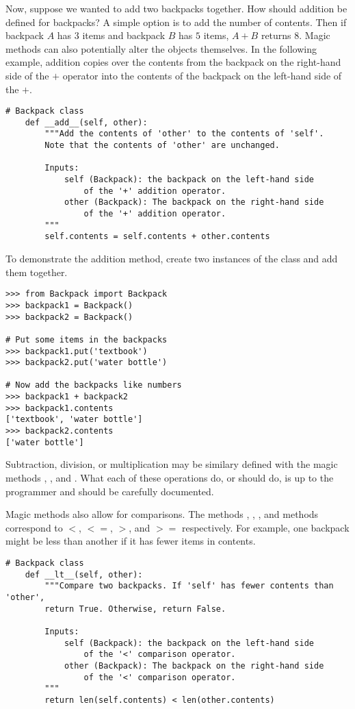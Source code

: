 Now, suppose we wanted to add two backpacks together.
How should addition be defined for backpacks?
A simple option is to add the number of contents.
Then if backpack $A$ has $3$ items and backpack $B$ has $5$ items, $A + B$ returns $8$.
Magic methods can also potentially alter the objects themselves.
In the following example, addition copies over the contents from the backpack on the right-hand side of the $+$ operator into the contents of the backpack on the left-hand side of the $+$.

\begin{lstlisting}
# Backpack class
    def __add__(self, other):
        """Add the contents of 'other' to the contents of 'self'.
        Note that the contents of 'other' are unchanged.
        
        Inputs:
            self (Backpack): the backpack on the left-hand side
                of the '+' addition operator.
            other (Backpack): The backpack on the right-hand side
                of the '+' addition operator.
        """
        self.contents = self.contents + other.contents
\end{lstlisting}

To demonstrate the addition method, create two instances of the  class and add them together.

\begin{lstlisting}
>>> from Backpack import Backpack
>>> backpack1 = Backpack()
>>> backpack2 = Backpack()

# Put some items in the backpacks
>>> backpack1.put('textbook')
>>> backpack2.put('water bottle')

# Now add the backpacks like numbers
>>> backpack1 + backpack2
>>> backpack1.contents
['textbook', 'water bottle']
>>> backpack2.contents
['water bottle']
\end{lstlisting}

Subtraction, division, or multiplication may be similary defined with the magic methods , , and .
What each of these operations do, or should do, is up to the programmer and should be carefully documented.

Magic methods also allow for comparisons.
The methods , , , and  methods correspond to $<$, $<=$, $>$, and $>=$ respectively.
For example, one backpack might be less than another if it has fewer items in contents.

\begin{lstlisting}
# Backpack class
    def __lt__(self, other):
        """Compare two backpacks. If 'self' has fewer contents than 'other',
        return True. Otherwise, return False.
        
        Inputs:
            self (Backpack): the backpack on the left-hand side
                of the '<' comparison operator.
            other (Backpack): The backpack on the right-hand side
                of the '<' comparison operator.
        """
        return len(self.contents) < len(other.contents)
\end{lstlisting}

